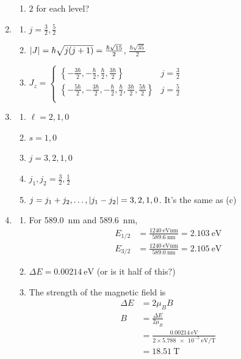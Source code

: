 \documentclass{homework}
\begin{document}
\begin{enumerate}
\begin{enumerate}
			\item $2$ for each level?
		\end{enumerate}
	
		\item \begin{enumerate}
			\item $j=\frac{3}{2}, \frac{5}{2}$
			\item $\abs{J} = \hbar \sqrt{j(j+1)} = \frac{\hbar \sqrt{15}}{2}$, $\frac{\hbar \sqrt{35}}{2}$
			\item $J_z = \begin{cases}
				\left\{ -\frac{3\hbar}{2}, -\frac{\hbar}{2}, \frac{\hbar}{2}, \frac{3\hbar}{2} \right\} & j = \frac{3}{2} \\
				\left\{ -\frac{5\hbar}{2}, -\frac{3\hbar}{2}, -\frac{\hbar}{2}, \frac{\hbar}{2}, \frac{3\hbar}{2}, \frac{5\hbar}{2} \right\} & j = \frac{5}{2} \\
			\end{cases}$
		\end{enumerate}
	
		\item \begin{enumerate}
			\item $\ell = 2, 1, 0$
			\item $s = 1, 0$
			\item $j = 3, 2, 1, 0$
			\item $j_1, j_2 = \frac{3}{2}, \frac{1}{2}$
			\item $j = j_1 + j_2, \dots, \abs{j_1 - j_2} = 3, 2, 1, 0$. It's the same as (c)
		\end{enumerate}
	
		\item \begin{enumerate}
			\item For \SI{589.0}{\nm} and \SI{589.6}{\nm}, \begin{align*}
				E_{1/2} & = \frac{\SI{1240}{\eV \nm}}{\SI{589.6}{\nm}} = \SI{2.103}{\eV} \\
				E_{3/2} & = \frac{\SI{1240}{\eV \nm}}{\SI{589.0}{\nm}} = \SI{2.105}{\eV}
			\end{align*}
			\item $\Delta E = \SI{0.00214}{\eV}$ (or is it half of this?)
			\item The strength of the magnetic field is \begin{align*}
				\Delta E & = 2 \mu_B B \\
				B & = \frac{\Delta E}{2 \mu_B }\\
					& = \frac{\SI{0.00214}{\eV}}{2 \times \SI{5.788e-5}{\eV \per \tesla}} \\
					& = \SI{18.51}{\tesla}
			\end{align*}
		\end{enumerate}
	

\end{enumerate}
\end{document}
